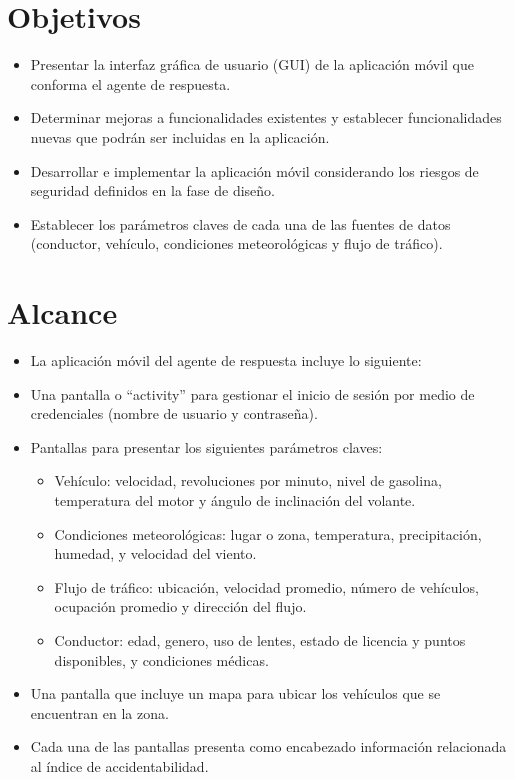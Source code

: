 \documentclass[a4paper,10pt, oneside, titlepage]{article}
\begin{document}
	\section{Objetivos}
	\begin{itemize}
		\item Presentar la interfaz gráfica de usuario (GUI) de la aplicación móvil que conforma el agente de respuesta.
		\item Determinar mejoras a funcionalidades existentes y establecer funcionalidades nuevas que podrán ser incluidas en la aplicación.
		\item Desarrollar e implementar la aplicación móvil considerando los riesgos de seguridad definidos en la fase de diseño.
		\item Establecer los parámetros claves de cada una de las fuentes de datos (conductor, vehículo, condiciones meteorológicas y flujo de tráfico).
	\end{itemize}
	
	\section{Alcance}
	\begin{itemize}
		\item La aplicación móvil del agente de respuesta incluye lo siguiente:
		\item Una pantalla o “activity” para gestionar el inicio de sesión por medio de credenciales (nombre de usuario y contraseña).
		\item Pantallas para presentar los siguientes parámetros claves:
		\begin{itemize}
			\item Vehículo: velocidad, revoluciones por minuto, nivel de gasolina, temperatura del motor y ángulo de inclinación del volante.
			\item Condiciones meteorológicas: lugar o zona, temperatura, precipitación, humedad, y velocidad del viento.
			\item Flujo de tráfico: ubicación, velocidad promedio, número de vehículos, ocupación promedio y dirección del flujo.
			\item Conductor: edad, genero, uso de lentes, estado de licencia y puntos disponibles, y condiciones médicas.
		\end{itemize}
		\item Una pantalla que incluye un mapa para ubicar los vehículos que se encuentran en la zona.
		\item Cada una de las pantallas presenta como encabezado información relacionada al índice de accidentabilidad.
	\end{itemize}
\end{document}
